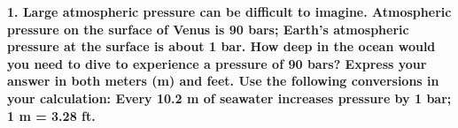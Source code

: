 \documentclass{report}
\title{\Huge{}}
\author{\huge{Nathan Warner}}
\date{\huge{}}
\begin{document}
    \bigbreak \noindent 
    \textbf{1. Large atmospheric pressure can be difficult to imagine. Atmospheric pressure on the
surface of Venus is 90 bars; Earth’s atmospheric pressure at the surface is about 1 bar. How
deep in the ocean would you need to dive to experience a pressure of 90 bars? Express your
answer in both meters (m) and feet. Use the following conversions in your calculation: Every
10.2 m of seawater increases pressure by 1 bar; 1 m = 3.28 ft.}
\bigbreak \noindent 
\end{document}
